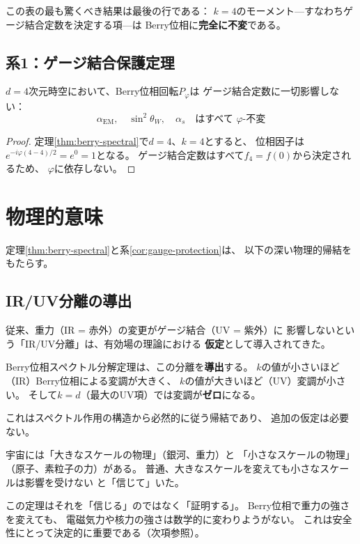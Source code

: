 \noindent
この表の最も驚くべき結果は最後の行である：
$k=4$のモーメント---すなわちゲージ結合定数を決定する項---は
Berry位相に\textbf{完全に不変}である。

\subsection{系1：ゲージ結合保護定理}

\begin{keyresult}[ゲージ結合保護]
\begin{corollary}[ゲージ結合保護]
\label{cor:gauge-protection}
$d=4$次元時空において、Berry位相回転$P_\varphi$は
ゲージ結合定数に一切影響しない：
\[
\alpha_{\mathrm{EM}},\quad \sin^2\theta_W,\quad \alpha_s
\quad\text{はすべて $\varphi$-不変}
\]
\end{corollary}
\end{keyresult}

\begin{proof}
定理\ref{thm:berry-spectral}で$d=4$、$k=4$とすると、
位相因子は$e^{-i\varphi(4-4)/2} = e^0 = 1$となる。
ゲージ結合定数はすべて$f_4 = f(0)$から決定されるため、
$\varphi$に依存しない。
\end{proof}


\section{物理的意味}
\label{sec:7.5}

定理\ref{thm:berry-spectral}と系\ref{cor:gauge-protection}は、
以下の深い物理的帰結をもたらす。

\subsection{IR/UV分離の導出}

従来、重力（IR = 赤外）の変更がゲージ結合（UV = 紫外）に
影響しないという「IR/UV分離」は、有効場の理論における
\textbf{仮定}として導入されてきた。

Berry位相スペクトル分解定理は、この分離を\textbf{導出}する。
$k$の値が小さいほど（IR）Berry位相による変調が大きく、
$k$の値が大きいほど（UV）変調が小さい。
そして$k=d$（最大のUV項）では変調が\textbf{ゼロ}になる。

これはスペクトル作用の構造から必然的に従う帰結であり、
追加の仮定は必要ない。

\begin{hsbox}
宇宙には「大きなスケールの物理」（銀河、重力）と
「小さなスケールの物理」（原子、素粒子の力）がある。
普通、大きなスケールを変えても小さなスケールは影響を受けない
と「信じて」いた。

この定理はそれを「信じる」のではなく「証明する」。
Berry位相で重力の強さを変えても、
電磁気力や核力の強さは数学的に変わりようがない。
これは安全性にとって決定的に重要である（次項参照）。
\end{hsbox}

